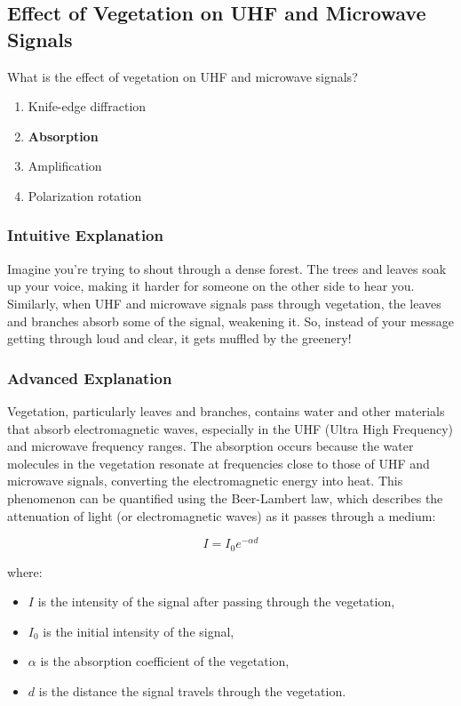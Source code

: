 \subsection{Effect of Vegetation on UHF and Microwave Signals}
\label{T3A02}

\begin{tcolorbox}[colback=gray!10!white,colframe=black!75!black,title=T3A02]
What is the effect of vegetation on UHF and microwave signals?
\begin{enumerate}[label=\Alph*)]
    \item Knife-edge diffraction
    \item \textbf{Absorption}
    \item Amplification
    \item Polarization rotation
\end{enumerate}
\end{tcolorbox}

\subsubsection{Intuitive Explanation}
Imagine you're trying to shout through a dense forest. The trees and leaves soak up your voice, making it harder for someone on the other side to hear you. Similarly, when UHF and microwave signals pass through vegetation, the leaves and branches absorb some of the signal, weakening it. So, instead of your message getting through loud and clear, it gets muffled by the greenery!

\subsubsection{Advanced Explanation}
Vegetation, particularly leaves and branches, contains water and other materials that absorb electromagnetic waves, especially in the UHF (Ultra High Frequency) and microwave frequency ranges. The absorption occurs because the water molecules in the vegetation resonate at frequencies close to those of UHF and microwave signals, converting the electromagnetic energy into heat. This phenomenon can be quantified using the Beer-Lambert law, which describes the attenuation of light (or electromagnetic waves) as it passes through a medium:

\[
I = I_0 e^{-\alpha d}
\]

where:
\begin{itemize}
    \item \( I \) is the intensity of the signal after passing through the vegetation,
    \item \( I_0 \) is the initial intensity of the signal,
    \item \( \alpha \) is the absorption coefficient of the vegetation,
    \item \( d \) is the distance the signal travels through the vegetation.
\end{itemize}

